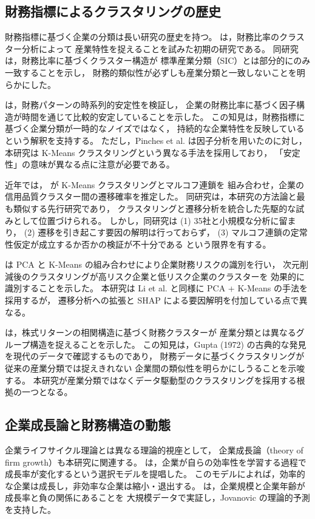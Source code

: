 \subsection{財務指標によるクラスタリングの歴史}

財務指標に基づく企業の分類は長い研究の歴史を持つ。
 は，財務比率のクラスター分析によって
産業特性を捉えることを試みた初期の研究である。
同研究は，財務比率に基づくクラスター構造が
標準産業分類（SIC）とは部分的にのみ一致することを示し，
財務的類似性が必ずしも産業分類と一致しないことを明らかにした。

 は，財務パターンの時系列的安定性を検証し，
企業の財務比率に基づく因子構造が時間を通じて比較的安定していることを示した。
この知見は，財務指標に基づく企業分類が一時的なノイズではなく，
持続的な企業特性を反映しているという解釈を支持する。
ただし，Pinches et al. は因子分析を用いたのに対し，
本研究は K-Means クラスタリングという異なる手法を採用しており，
「安定性」の意味が異なる点に注意が必要である。

近年では， が K-Means クラスタリングとマルコフ連鎖を
組み合わせ，企業の信用品質クラスター間の遷移確率を推定した。
同研究は，本研究の方法論と最も類似する先行研究であり，
クラスタリングと遷移分析を統合した先駆的な試みとして位置づけられる。
しかし，同研究は (1) 35社と小規模な分析に留まり，
(2) 遷移を引き起こす要因の解明は行っておらず，
(3) マルコフ連鎖の定常性仮定が成立するか否かの検証が不十分である
という限界を有する。

 は PCA と K-Means の組み合わせにより企業財務リスクの識別を行い，
次元削減後のクラスタリングが高リスク企業と低リスク企業のクラスターを
効果的に識別することを示した。
本研究は Li et al. と同様に PCA + K-Means の手法を採用するが，
遷移分析への拡張と SHAP による要因解明を付加している点で異なる。

 は，株式リターンの相関構造に基づく財務クラスターが
産業分類とは異なるグループ構造を捉えることを示した。
この知見は，Gupta (1972) の古典的な発見を現代のデータで確認するものであり，
財務データに基づくクラスタリングが従来の産業分類では捉えきれない
企業間の類似性を明らかにしうることを示唆する。
本研究が産業分類ではなくデータ駆動型のクラスタリングを採用する根拠の一つとなる。

\subsection{企業成長論と財務構造の動態}

企業ライフサイクル理論とは異なる理論的視座として，
企業成長論（theory of firm growth）も本研究に関連する。
 は，企業が自らの効率性を学習する過程で
成長率が変化するという選択モデルを提唱した。
このモデルによれば，効率的な企業は成長し，非効率な企業は縮小・退出する。
 は，企業規模と企業年齢が成長率と負の関係にあることを
大規模データで実証し，Jovanovic の理論的予測を支持した。

